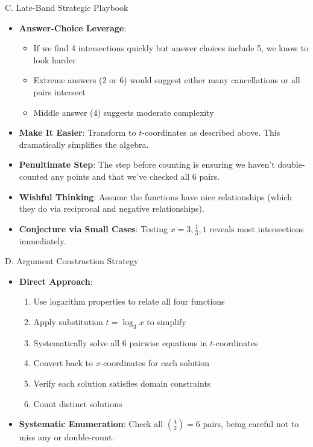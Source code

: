 \documentclass[12pt]{article}
\begin{document}
\begin{strategicbox}{C. Late-Band Strategic Playbook}
\begin{itemize}[leftmargin=*]
    \item \textbf{Answer-Choice Leverage}: 
    \begin{itemize}
        \item If we find 4 intersections quickly but answer choices include 5, we know to look harder
        \item Extreme answers (2 or 6) would suggest either many cancellations or all pairs intersect
        \item Middle answer (4) suggests moderate complexity
    \end{itemize}
    
    \item \textbf{Make It Easier}: Transform to $t$-coordinates as described above. This dramatically simplifies the algebra.
    
    \item \textbf{Penultimate Step}: The step before counting is ensuring we haven't double-counted any points and that we've checked all 6 pairs.
    
    \item \textbf{Wishful Thinking}: Assume the functions have nice relationships (which they do via reciprocal and negative relationships).
    
    \item \textbf{Conjecture via Small Cases}: Testing $x = 3, \frac{1}{3}, 1$ reveals most intersections immediately.
\end{itemize}
\end{strategicbox}

\begin{strategicbox}{D. Argument Construction Strategy}
\begin{itemize}[leftmargin=*]
    \item \textbf{Direct Approach}: 
    \begin{enumerate}
        \item Use logarithm properties to relate all four functions
        \item Apply substitution $t = \log_3 x$ to simplify
        \item Systematically solve all 6 pairwise equations in $t$-coordinates
        \item Convert back to $x$-coordinates for each solution
        \item Verify each solution satisfies domain constraints
        \item Count distinct solutions
    \end{enumerate}
    
    \item \textbf{Systematic Enumeration}: Check all $\binom{4}{2} = 6$ pairs, being careful not to miss any or double-count.
\end{itemize}
\end{strategicbox}
\end{document}
